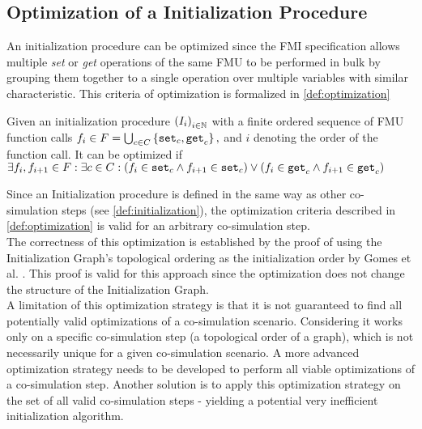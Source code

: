 \subsection{Optimization of a Initialization Procedure}
An initialization procedure can be optimized since the FMI specification allows multiple \textit{set} or \textit{get} operations of the same FMU to be performed in bulk by grouping them together to a single operation over multiple variables with similar characteristic. This criteria of optimization is formalized in \cref{def:optimization}
\begin{definition}\label{def:optimization}
  Given an initialization procedure $ \left( I_i \right)_{i \in \mathbb{N}}$ with a finite ordered sequence of FMU function calls $f_i \in F = \bigcup_{c \in C}  \left\{ \mathtt{set}_{c},\mathtt{get}_{c} \right\},$ and $i$ denoting the order of the function call. It can be optimized if $\exists f_i, f_{i +1} \in F : \exists c \in C :(f_i \in {\mathtt{set}_{c}} \land f_{i+1} \in {\mathtt{set}_{c}}) \lor (f_i \in {\mathtt{get}_{c}} \land f_{i+1} \in {\mathtt{get}_{c}})$
\end{definition}
Since an Initialization procedure is defined in the same way as other co-simulation steps (see \cref{def:initialization}), the optimization criteria described in \cref{def:optimization} is valid for an arbitrary co-simulation step. \\
The correctness of this optimization is established by the proof of using the Initialization Graph's topological ordering as the initialization order by Gomes et al. \cite{Gomes2019}. This proof is valid for this approach since the optimization does not change the structure of the Initialization Graph. \\
A limitation of this optimization strategy is that it is not guaranteed to find all potentially valid optimizations of a co-simulation scenario. Considering it works only on a specific co-simulation step (a topological order of a graph), which is not necessarily unique for a given co-simulation scenario. A more advanced optimization strategy needs to be developed to perform all viable optimizations of a co-simulation step. Another solution is to apply this optimization strategy on the set of all valid co-simulation steps - yielding a potential very inefficient initialization algorithm.

